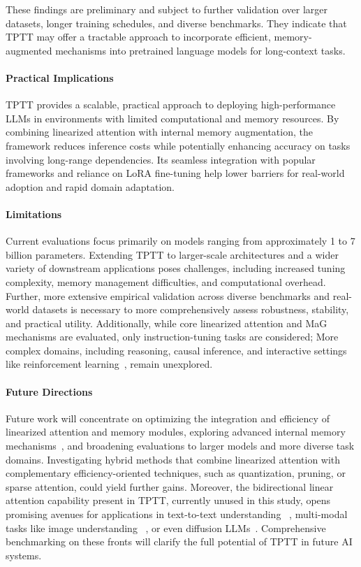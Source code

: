 \documentclass[10pt,a4paper]{article}
\begin{document}
These findings are preliminary and subject to further validation over larger datasets, longer training schedules, and diverse benchmarks. They indicate that TPTT may offer a tractable approach to incorporate efficient, memory-augmented mechanisms into pretrained language models for long-context tasks.

\paragraph{Practical Implications}  
TPTT provides a scalable, practical approach to deploying high-performance LLMs in environments with limited computational and memory resources. By combining linearized attention with internal memory augmentation, the framework reduces inference costs while potentially enhancing accuracy on tasks involving long-range dependencies. Its seamless integration with popular frameworks and reliance on LoRA fine-tuning help lower barriers for real-world adoption and rapid domain adaptation.

\paragraph{Limitations}  
Current evaluations focus primarily on models ranging from approximately 1 to 7 billion parameters. Extending TPTT to larger-scale architectures and a wider variety of downstream applications poses challenges, including increased tuning complexity, memory management difficulties, and computational overhead. Further, more extensive empirical validation across diverse benchmarks and real-world datasets is necessary to more comprehensively assess robustness, stability, and practical utility. Additionally, while core linearized attention and MaG mechanisms are evaluated, only instruction-tuning tasks are considered; More complex domains, including reasoning, causal inference, and interactive settings like reinforcement learning~\cite{shao2024deepseekmath}, remain unexplored.

\paragraph{Future Directions}  
Future work will concentrate on optimizing the integration and efficiency of linearized attention and memory modules, exploring advanced internal memory mechanisms~\cite{behrouz2025s}, and broadening evaluations to larger models and more diverse task domains. Investigating hybrid methods that combine linearized attention with complementary efficiency-oriented techniques, such as quantization, pruning, or sparse attention, could yield further gains. Moreover, the bidirectional linear attention capability present in TPTT, currently unused in this study, opens promising avenues for applications in text-to-text understanding ~\cite{devlin2019bert}, multi-modal tasks like image understanding ~\cite{dosovitskiy2020image}, or even diffusion LLMs~\cite{ye2025dream}. Comprehensive benchmarking on these fronts will clarify the full potential of TPTT in future AI systems.
\end{document}

